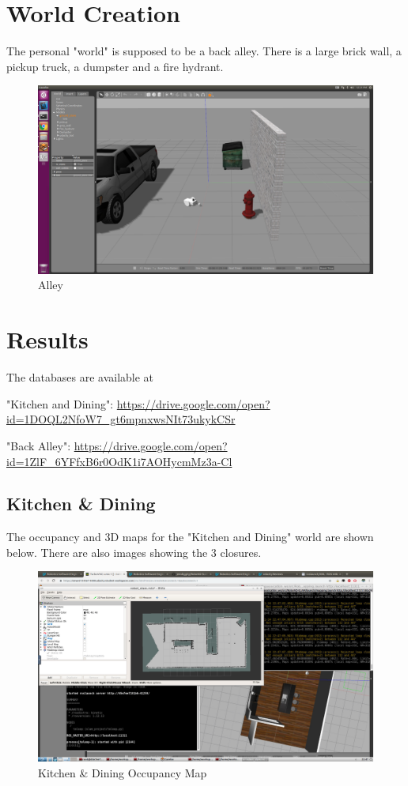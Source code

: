 \documentclass[10pt,journal,compsoc]{IEEEtran}
\begin{document}
\section{World Creation}
The personal "world" is supposed to be a back alley. There is a large brick wall, a pickup truck, a dumpster and a fire hydrant.

\begin{figure}[thpb]
    \centering
    \includegraphics[width=\linewidth]{alley_no_cone}
    \caption{Alley}
    \label{fig:alley}
\end{figure}

\section{Results}

The databases are available at

"Kitchen and Dining":
\url{https://drive.google.com/open?id=1DOQL2NfoW7_gt6mpnxwsNIt73ukykCSr}

"Back Alley":
\url{https://drive.google.com/open?id=1ZlF_6YFfxB6r0OdK1i7AOHycmMz3a-Cl}


\subsection{Kitchen \& Dining}

The occupancy and 3D maps for the "Kitchen and Dining" world are shown below. There are also images showing the 3 closures.

\begin{figure}[thpb]
    \centering
    \includegraphics[width=\linewidth]{dining_map}
    \caption{Kitchen \& Dining Occupancy Map}
    \label{fig:dining_2d}
\end{figure}
\end{document}
